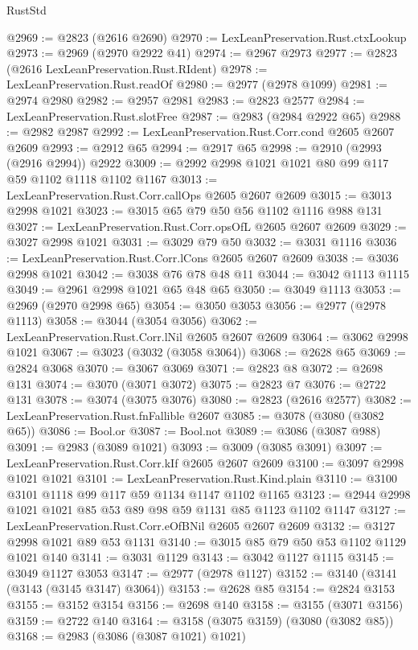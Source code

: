 \begin{lexlean}{RustStd}
\begin{coremodule}
@2969 := @2823 (@2616 @2690)
@2970 := LexLeanPreservation.Rust.ctxLookup
@2973 := @2969 (@2970 @2922 @41)
@2974 := @2967 @2973
@2977 := @2823 (@2616 LexLeanPreservation.Rust.RIdent)
@2978 := LexLeanPreservation.Rust.readOf
@2980 := @2977 (@2978 @1099)
@2981 := @2974 @2980
@2982 := @2957 @2981
@2983 := @2823 @2577
@2984 := LexLeanPreservation.Rust.slotFree
@2987 := @2983 (@2984 @2922 @65)
@2988 := @2982 @2987
@2992 := LexLeanPreservation.Rust.Corr.cond @2605 @2607 @2609
@2993 := @2912 @65
@2994 := @2917 @65
@2998 := @2910 (@2993 (@2916 @2994)) @2922
@3009 := @2992 @2998 @1021 @1021 @80 @99 @117 @59 @1102 @1118 @1102 @1167
@3013 := LexLeanPreservation.Rust.Corr.callOps @2605 @2607 @2609
@3015 := @3013 @2998 @1021
@3023 := @3015 @65 @79 @50 @56 @1102 @1116 @988 @131
@3027 := LexLeanPreservation.Rust.Corr.opsOfL @2605 @2607 @2609
@3029 := @3027 @2998 @1021
@3031 := @3029 @79 @50
@3032 := @3031 @1116
@3036 := LexLeanPreservation.Rust.Corr.lCons @2605 @2607 @2609
@3038 := @3036 @2998 @1021
@3042 := @3038 @76 @78 @48 @11
@3044 := @3042 @1113 @1115
@3049 := @2961 @2998 @1021 @65 @48 @65
@3050 := @3049 @1113
@3053 := @2969 (@2970 @2998 @65)
@3054 := @3050 @3053
@3056 := @2977 (@2978 @1113)
@3058 := @3044 (@3054 @3056)
@3062 := LexLeanPreservation.Rust.Corr.lNil @2605 @2607 @2609
@3064 := @3062 @2998 @1021
@3067 := @3023 (@3032 (@3058 @3064))
@3068 := @2628 @65
@3069 := @2824 @3068
@3070 := @3067 @3069
@3071 := @2823 @8
@3072 := @2698 @131
@3074 := @3070 (@3071 @3072)
@3075 := @2823 @7
@3076 := @2722 @131
@3078 := @3074 (@3075 @3076)
@3080 := @2823 (@2616 @2577)
@3082 := LexLeanPreservation.Rust.fnFallible @2607
@3085 := @3078 (@3080 (@3082 @65))
@3086 := Bool.or
@3087 := Bool.not
@3089 := @3086 (@3087 @988)
@3091 := @2983 (@3089 @1021)
@3093 := @3009 (@3085 @3091)
@3097 := LexLeanPreservation.Rust.Corr.kIf @2605 @2607 @2609
@3100 := @3097 @2998 @1021 @1021
@3101 := LexLeanPreservation.Rust.Kind.plain
@3110 := @3100 @3101 @1118 @99 @117 @59 @1134 @1147 @1102 @1165
@3123 := @2944 @2998 @1021 @1021 @85 @53 @89 @98 @59 @1131 @85 @1123 @1102 @1147
@3127 := LexLeanPreservation.Rust.Corr.eOfBNil @2605 @2607 @2609
@3132 := @3127 @2998 @1021 @89 @53 @1131
@3140 := @3015 @85 @79 @50 @53 @1102 @1129 @1021 @140
@3141 := @3031 @1129
@3143 := @3042 @1127 @1115
@3145 := @3049 @1127 @3053
@3147 := @2977 (@2978 @1127)
@3152 := @3140 (@3141 (@3143 (@3145 @3147) @3064))
@3153 := @2628 @85
@3154 := @2824 @3153
@3155 := @3152 @3154
@3156 := @2698 @140
@3158 := @3155 (@3071 @3156)
@3159 := @2722 @140
@3164 := @3158 (@3075 @3159) (@3080 (@3082 @85))
@3168 := @2983 (@3086 (@3087 @1021) @1021)

\end{coremodule}
\end{lexlean}
